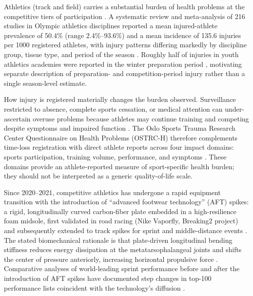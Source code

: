 Athletics (track and field) carries a substantial burden of health problems at the competitive tiers of participation \citep{mckay2022tier}. A systematic review and meta-analysis of 216 studies in Olympic athletics disciplines reported a mean injured-athlete prevalence of 50.4\% (range 2.4\%--93.6\%) and a mean incidence of 135.6 injuries per 1000 registered athletes, with injury patterns differing markedly by discipline group, tissue type, and period of the season \citep{edouard2020injury}. Roughly half of injuries in youth athletics academies were reported in the winter preparation period \citep{martinezsilvan2021injury}, motivating separate description of preparation- and competition-period injury rather than a single season-level estimate.

How injury is registered materially changes the burden observed. Surveillance restricted to absence, complete sports cessation, or medical attention can under-ascertain overuse problems because athletes may continue training and competing despite symptoms and impaired function \citep{clarsen2013ostrc}. The Oslo Sports Trauma Research Center Questionnaire on Health Problems (OSTRC-H) therefore complements time-loss registration with direct athlete reports across four impact domains: sports participation, training volume, performance, and symptoms \citep{clarsen2014ostrch,clarsen2020ostrc}. These domains provide an athlete-reported measure of sport-specific health burden; they should not be interpreted as a generic quality-of-life scale.

Since 2020--2021, competitive athletics has undergone a rapid equipment transition with the introduction of ``advanced footwear technology'' (AFT) spikes: a rigid, longitudinally curved carbon-fiber plate embedded in a high-resilience foam midsole, first validated in road racing (Nike Vaporfly, Breaking2 project) and subsequently extended to track spikes for sprint and middle-distance events \citep{healey2022superspikes}. The stated biomechanical rationale is that plate-driven longitudinal bending stiffness reduces energy dissipation at the metatarsophalangeal joints and shifts the center of pressure anteriorly, increasing horizontal propulsive force \citep{willwacher2016stiffness}. Comparative analyses of world-leading sprint performance before and after the introduction of AFT spikes have documented step changes in top-100 performance lists coincident with the technology's diffusion \citep{mason2023superspikes}.

